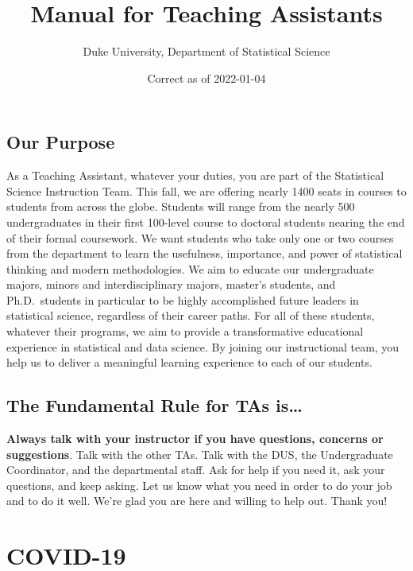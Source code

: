 \documentclass[
]{article}
\title{Manual for Teaching Assistants}
\author{Duke University, Department of Statistical Science}
\date{Correct as of 2022-01-04}
\begin{document}
\maketitle

{
\setcounter{tocdepth}{2}
\tableofcontents
}
\hypertarget{our-purpose}{%
\subsection*{Our Purpose}\label{our-purpose}}

As a Teaching Assistant, whatever your duties, you are part of the Statistical Science Instruction Team. This fall, we are offering nearly 1400 seats in courses to students from across the globe. Students will range from the nearly 500 undergraduates in their first 100-level course to doctoral students nearing the end of their formal coursework. We want students who take only one or two courses from the department to learn the usefulness, importance, and power of statistical thinking and modern methodologies. We aim to educate our undergraduate majors, minors and interdisciplinary majors, master's students, and Ph.D.~students in particular to be highly accomplished future leaders in statistical science, regardless of their career paths. For all of these students, whatever their programs, we aim to provide a transformative educational experience in statistical and data science. By joining our instructional team, you help us to deliver a meaningful learning experience to each of our students.

\hypertarget{the-fundamental-rule-for-tas-is}{%
\subsection*{The Fundamental Rule for TAs is\ldots{}}\label{the-fundamental-rule-for-tas-is}}

\textbf{Always talk with your instructor if you have questions, concerns or suggestions}. Talk with the other TAs. Talk with the DUS, the Undergraduate Coordinator, and the departmental staff. Ask for help if you need it, ask your questions, and keep asking. Let us know what you need in order to do your job and to do it well. We're glad you are here and willing to help out. Thank you!

\hypertarget{covid-19}{%
\section{COVID-19}\label{covid-19}}
\end{document}
